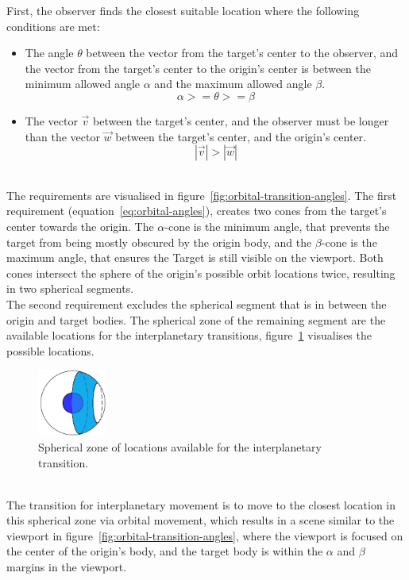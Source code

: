 First, the observer finds the closest suitable location where the following conditions are met:
\begin{itemize}
    \item The angle $\theta$ between the vector from the target's center to the observer, and the vector from the
    target's center to the origin's center is between the minimum allowed angle $\alpha$ and the maximum allowed
    angle $\beta$.
    \begin{equation}
        \label{eq:orbital-angles}
        \alpha >= \theta >= \beta
    \end{equation}

    \item The vector $\vec{v}$ between the target's center, and the observer must be longer than the vector $\vec{w}$
    between the target's center, and the origin's center.
    \begin{equation}
        \label{eq:orbital-magnitudes}
        |\vec{v}| > |\vec{w}|
    \end{equation}
\end{itemize}
\\
The requirements are visualised in figure~\ref{fig:orbital-transition-angles}.
The first requirement (equation~\ref{eq:orbital-angles}), creates two cones from the target's center towards the origin.
The $\alpha$-cone is the minimum angle, that prevents the target from being mostly obscured by the origin body, and
the $\beta$-cone is the maximum angle, that ensures the Target is still visible on the viewport.
Both cones intersect the sphere of the origin's possible orbit locations twice, resulting in two spherical segments.
\\
The second requirement excludes the spherical segment that is in between the origin and target bodies.
The spherical zone of the remaining segment are the available locations for the interplanetary transitions,
figure~\ref{fig:orbital-transition-zone} visualises the possible locations.
\begin{figure}
    \centering
    \includegraphics[width=0.2\textwidth]{content/4_3_autoNavigation/img/OrbitTransitionSphericalZone}
    \caption{Spherical zone of locations available for the interplanetary transition.}
    \label{fig:orbital-transition-zone}
\end{figure}
\\
The transition for interplanetary movement is to move to the closest location in this spherical zone via orbital
movement, which results in a scene similar to the viewport in figure~\ref{fig:orbital-transition-angles}, where the
viewport is focused on the center of the origin's body, and the target body is within the $\alpha$ and $\beta$
margins in the viewport.

